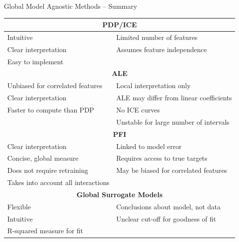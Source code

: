 \documentclass[ignorenonframetext,xcolor=x11names]{beamer}
\begin{document}
\begin{frame}{Global Model Agnostic Methods -- Summary}
\footnotesize
\renewcommand{\arraystretch}{1.1}
\begin{tabular}{l|l} \hline
\multicolumn{2}{c}{\textbf{PDP/ICE}} \\ \hline
Intuitive & Limited number of features \\
Clear interpretation & Assumes feature independence \\
Easy to implement & \\ \hline
\multicolumn{2}{c}{\textbf{ALE}} \\ \hline
Unbiased for correlated features & Local interpretation only\\
Clear interpretation & ALE may differ from linear coefficients\\ 
Faster to compute than PDP & No ICE curves \\
& Unstable for large number of intervals \\  \hline
\multicolumn{2}{c}{\textbf{PFI}} \\ \hline
Clear interpretation & Linked to model error \\
Concise, global measure & Requires access to true targets \\
Does not require retraining & May be biased for correlated features \\
Takes into account all interactions & \\ \hline
\multicolumn{2}{c}{\textbf{Global Surrogate Models}} \\ \hline
Flexible & Conclusions about model, not data \\ 
Intuitive & Unclear cut-off for goodness of fit \\
R-squared measure for fit & \\ \hline
\end{tabular}
\end{frame}
\end{document}
